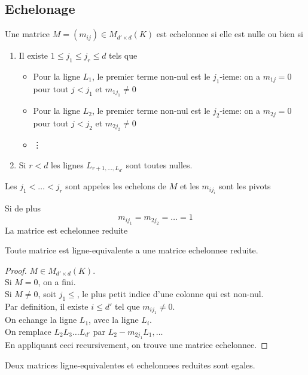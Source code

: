 \documentclass[../main.tex]{subfiles}
\begin{document}
\subsection{Echelonage}
\begin{defn}
	Une matrice $M= ( m_{ij} ) \in M_{d'\times d} ( K)  $ est echelonnee si elle est nulle ou bien si
	\begin{enumerate}
	\item Il existe $1 \leq j_1 \leq j_r \leq d$ tels que
		\begin{itemize}
		\item Pour la ligne $L_1$, le premier terme non-nul est le $j_1$-ieme: on a $m_{1j} =0$ pour tout $j<j_1$ et $m_{1j_1} \neq 0$ 
		\item Pour la ligne $L_2$, le premier terme non-nul est le $j_2$-ieme: on a $m_{2j}=0 $ pour tout $j<j_2$ et $m_{2j_2}\neq 0 $
		\item \vdots
		\end{itemize}
		
	\item Si $r<d$ les lignes $L_{r+1,\ldots, L_{d'} } $ sont toutes nulles.
	\end{enumerate}
Les $j_1< \ldots< j_r$ sont appeles les echelons de $M$ et les $m_{ij_i} $ sont les pivots	
\end{defn}
\begin{defn}
Si de plus 
\[ 
m_{ij_1} = m_{2j_2} = \ldots = 1
\]
La matrice est echelonnee reduite
\end{defn}
\begin{thm}
Toute matrice est ligne-equivalente a une matrice echelonnee reduite.
\end{thm}
\begin{proof}
	$M \in M_{d'\times d} ( K) $.\\
	Si $M= 0$, on a fini.\\
	Si $M\neq 0$, soit $j_1\leq $, le plus petit indice d'une colonne qui est non-nul.\\
	Par definition, il existe $i\leq d'$ tel que $m_{ij_1} \neq 0$.\\
	On echange la ligne $L_1$, avec la ligne $L_i$.\\
	On remplace $L_2 L_3\ldots L_{d'} $ par $L_2- m_{2j_1} L_1, \ldots$ \\
	En appliquant ceci recursivement, on trouve une matrice echelonnee.
\end{proof}
\begin{propo}
Deux matrices ligne-equivalentes et echelonnees reduites sont egales.
\end{propo}

	
\end{document}
